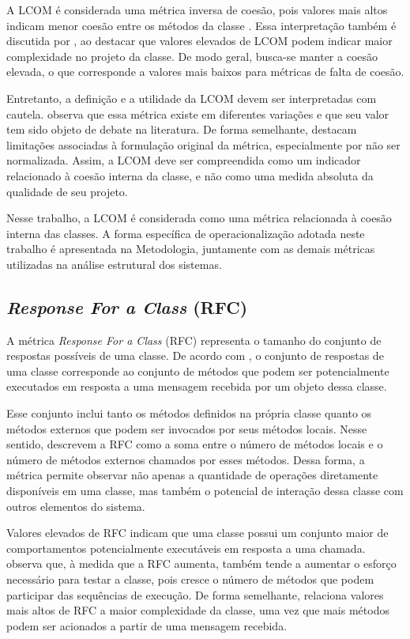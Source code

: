 A LCOM é considerada uma métrica inversa de coesão, pois valores mais altos indicam menor coesão entre os métodos da classe 
\cite{fenton2015}. Essa interpretação também é discutida por , ao destacar que valores elevados de 
LCOM podem indicar maior complexidade no projeto da classe. De modo geral, busca-se manter a coesão elevada, o que corresponde 
a valores mais baixos para métricas de falta de coesão.

Entretanto, a definição e a utilidade da LCOM devem ser interpretadas com cautela.  observa que essa 
métrica existe em diferentes variações e que seu valor tem sido objeto de debate na literatura. De forma semelhante, 
 destacam limitações associadas à formulação original da métrica, especialmente por não ser normalizada. 
Assim, a LCOM deve ser compreendida como um indicador relacionado à coesão interna da classe, e não como uma medida absoluta da 
qualidade de seu projeto.

Nesse trabalho, a LCOM é considerada como uma métrica relacionada à coesão interna das classes. A forma específica de 
operacionalização adotada neste trabalho é apresentada na Metodologia, juntamente com as demais métricas utilizadas na análise 
estrutural dos sistemas.

\subsection{\textit{Response For a Class} (RFC)}
\label{sec:rfc}

A métrica \textit{Response For a Class} (RFC) representa o tamanho do conjunto de respostas possíveis de uma classe. De acordo com 
, o conjunto de respostas de uma classe corresponde ao conjunto de métodos que podem ser potencialmente 
executados em resposta a uma mensagem recebida por um objeto dessa classe.

Esse conjunto inclui tanto os métodos definidos na própria classe quanto os métodos externos que podem ser invocados por seus
métodos locais. Nesse sentido,  descrevem a RFC como a soma entre o número de métodos locais e o número 
de métodos externos chamados por esses métodos. Dessa forma, a métrica permite observar não apenas a quantidade de operações 
diretamente disponíveis em uma classe, mas também o potencial de interação dessa classe com outros elementos do sistema.

Valores elevados de RFC indicam que uma classe possui um conjunto maior de comportamentos potencialmente executáveis em resposta 
a uma chamada.  observa que, à medida que a RFC aumenta, também tende a aumentar o esforço necessário 
para testar a classe, pois cresce o número de métodos que podem participar das sequências de execução. De forma semelhante, 
 relaciona valores mais altos de RFC a maior complexidade da classe, uma vez que mais métodos 
podem ser acionados a partir de uma mensagem recebida.

